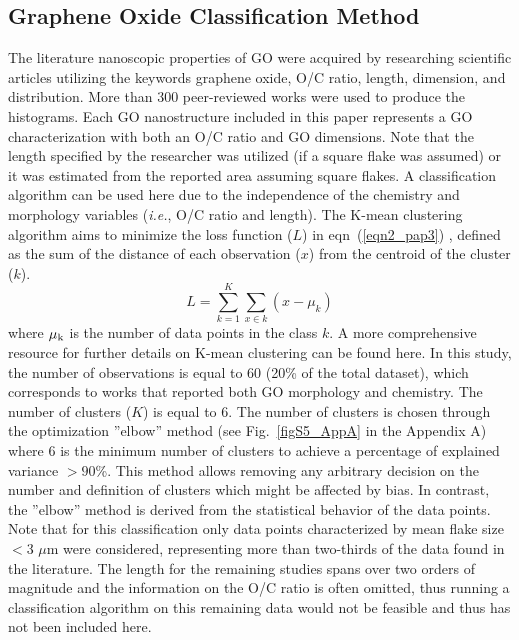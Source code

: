 \subsection{Graphene Oxide Classification Method}
The literature nanoscopic properties of GO were acquired by researching scientific articles utilizing the keywords graphene oxide, O/C ratio, length, dimension, and distribution. More than 300 peer-reviewed works were used to produce the histograms. Each GO nanostructure included in this paper represents a GO characterization with both an O/C ratio and GO dimensions. Note that the length specified by the researcher was utilized (if a square flake was assumed) or it was estimated from the reported area assuming square flakes. A classification algorithm can be used here due to the independence of the chemistry and morphology variables (\textit{i.e.}, O/C ratio and length). The K-mean clustering algorithm aims to minimize the loss function ($L$) in eqn~(\ref{eqn2_pap3}) , defined as the sum of the distance of each observation ($x$) from the centroid of the cluster ($k$).
\begin{equation}
  L =\sum_{k=1}^{K} \sum_{x\in k} (x-\mu_k)
 \label{eqn2_pap3}
\end{equation}
where $\mu\textsubscript{k}$ is the number of data points in the class $k$. A more comprehensive resource for further details on K-mean clustering can be found here.\cite{bishop2006pattern} In this study, the number of observations is equal to 60 (20\% of the total dataset), which corresponds to works that reported both GO morphology and chemistry. The number of clusters ($K$) is equal to 6. The number of clusters is chosen through the optimization ''elbow'' method (see Fig.~\ref{figS5_AppA} in the Appendix A) where 6 is the minimum number of clusters to achieve a percentage of explained variance $>90$\%.\cite{hardy1994examination} This method allows removing any arbitrary decision on the number and definition of clusters which might be affected by bias. In contrast, the ''elbow'' method is derived from the statistical behavior of the data points. Note that for this classification only data points characterized by mean flake size $<3$ $\mu$m were considered, representing more than two-thirds of the data found in the literature. The length for the remaining studies spans over two orders of magnitude and the information on the O/C ratio is often omitted, thus running a classification algorithm on this remaining data would not be feasible and thus has not been included here.

